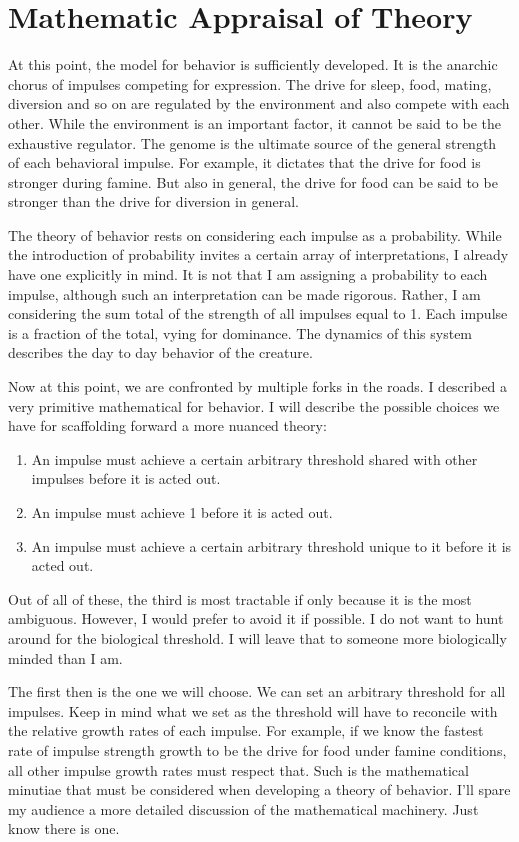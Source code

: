 \documentclass[12pt]{article}
\begin{document}
\section{Mathematic Appraisal of Theory}
At this point, the model for behavior is sufficiently developed.
It is the anarchic chorus of impulses competing for expression.
The drive for sleep, food, mating, diversion and so on are regulated by the environment and also compete with each other.
While the environment is an important factor, it cannot be said to be the exhaustive regulator.
The genome is the ultimate source of the general strength of each behavioral impulse.
For example, it dictates that the drive for food is stronger during famine.
But also in general, the drive for food can be said to be stronger than the drive for diversion in general.

The theory of behavior rests on considering each impulse as a probability.
While the introduction of probability invites a certain array of interpretations, I already have one explicitly in mind.
It is not that I am assigning a probability to each impulse, although such an interpretation can be made rigorous.
Rather, I am considering the sum total of the strength of all impulses equal to 1.
Each impulse is a fraction of the total, vying for dominance.
The dynamics of this system describes the day to day behavior of the creature.

Now at this point, we are confronted by multiple forks in the roads.
I described a very primitive mathematical for behavior.
I will describe the possible choices we have for scaffolding forward a more nuanced theory:\

\begin{enumerate}
    \item An impulse must achieve a certain arbitrary threshold shared with other impulses before it is acted out.
    \item An impulse must achieve 1 before it is acted out.
    \item An impulse must achieve a certain arbitrary threshold unique to it before it is acted out.
\end{enumerate}

Out of all of these, the third is most tractable if only because it is the most ambiguous.
However, I would prefer to avoid it if possible.
I do not want to hunt around for the biological threshold.
I will leave that to someone more biologically minded than I am.

The first then is the one we will choose.
We can set an arbitrary threshold for all impulses.
Keep in mind what we set as the threshold will have to reconcile with the relative growth rates of each impulse.
For example, if we know the fastest rate of impulse strength growth to be the drive for food under famine conditions, all other impulse growth rates must respect that.
Such is the mathematical minutiae that must be considered when developing a theory of behavior.
I'll spare my audience a more detailed discussion of the mathematical machinery.
Just know there is one.
\end{document}
